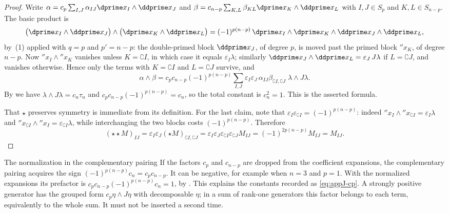 \begin{proof}
Write $\alpha=c_p\sum_{I,J}\alpha_{IJ}\dprime x_I\wedge\ddprime x_J$ and
$\beta=c_{n-p}\sum_{K,L}\beta_{KL}\dprime x_K\wedge\ddprime x_L$ with
$I,J\in S_p$ and $K,L\in S_{n-p}$.  The basic product is
\[
 \bigl(\dprime x_I\wedge\ddprime x_J\bigr)\wedge
 \bigl(\dprime x_K\wedge\ddprime x_L\bigr)
 =(-1)^{p(n-p)}\,
   \dprime x_I\wedge\dprime x_K\wedge\ddprime x_J\wedge\ddprime x_L,
\]
by \,(1) applied with $q=p$ and $p'=n-p$: the
double-primed block $\ddprime x_J$, of degree $p$, is moved past the primed
block $\dprime x_K$, of degree $n-p$.  Now
$\dprime x_I\wedge\dprime x_K$ vanishes unless $K=\complement I$, in which
case it equals $\varepsilon_I\lambda$; similarly
$\ddprime x_J\wedge\ddprime x_L=\varepsilon_J\,J\lambda$ if
$L=\complement J$, and vanishes otherwise.  Hence only the terms with
$K=\complement I$ and $L=\complement J$ survive, and
\[
 \alpha\wedge\beta
 =c_pc_{n-p}(-1)^{p(n-p)}
   \sum_{I,J}\varepsilon_I\varepsilon_J\,
   \alpha_{IJ}\beta_{\complement I,\complement J}\;
   \lambda\wedge J\lambda .
\]
By  we have $\lambda\wedge J\lambda=c_n\tau_n$ and
$c_pc_{n-p}(-1)^{p(n-p)}=c_n$, so the total constant is $c_n^2=1$.  This is
the asserted formula.

That $\star$ preserves symmetry is immediate from its definition.  For the
last claim, note that $\varepsilon_I\varepsilon_{\complement I}
=(-1)^{p(n-p)}$: indeed
$\dprime x_I\wedge\dprime x_{\complement I}=\varepsilon_I\lambda$ and
$\dprime x_{\complement I}\wedge\dprime x_I=\varepsilon_{\complement I}\lambda$,
while interchanging the two blocks costs $(-1)^{p(n-p)}$.  Therefore
\[
 (\star\star M)_{IJ}
 =\varepsilon_I\varepsilon_J(\star M)_{\complement I,\complement J}
 =\varepsilon_I\varepsilon_J\varepsilon_{\complement I}
   \varepsilon_{\complement J}M_{IJ}
 =(-1)^{2p(n-p)}M_{IJ}=M_{IJ}.
\]
\end{proof}

\begin{warning}{The normalization in the complementary pairing}
If the factors $c_p$ and $c_{n-p}$ are dropped from the coefficient
expansions, the complementary pairing acquires the sign
$(-1)^{p(n-p)}c_n=c_pc_{n-p}$.  It can be negative, for example when
$n=3$ and $p=1$.  With the normalized expansions its prefactor is
$c_pc_{n-p}(-1)^{p(n-p)}c_n=1$, by
.  This explains the constants recorded as
\eqref{eq:appJ-cp}.  A strongly positive generator has the grouped form
$c_p\eta\wedge J\eta$ with decomposable $\eta$; in a sum of rank-one
generators this factor belongs to each term, equivalently to the whole sum.
It must not be inserted a second time.
\end{warning}

